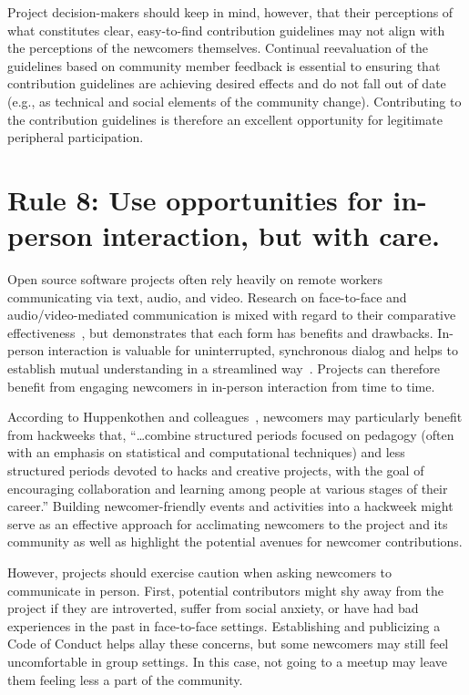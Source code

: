\documentclass[10pt,letterpaper]{article}
\newcommand{\rulemajor}[1]{\section*{#1}}
\begin{document}
Project decision-makers should keep in mind, however,
that their perceptions of what constitutes clear, easy-to-find contribution guidelines
may not align with the perceptions of the newcomers themselves.
Continual reevaluation of the guidelines based on community member feedback is essential
to ensuring that contribution guidelines are achieving desired effects
and do not fall out of date (e.g., as technical and social elements of the community change).
Contributing to the contribution guidelines is therefore
an excellent opportunity for legitimate peripheral participation.

\rulemajor{Rule 8: Use opportunities for in-person interaction, but with care.}

Open source software projects often rely heavily on remote workers communicating via text, audio, and video.
Research on face-to-face and audio/video-mediated communication is mixed
with regard to their comparative effectiveness~\cite{doherty1997,gallupe1990,nardi2002},
but demonstrates that each form has benefits and drawbacks.
In-person interaction is valuable for uninterrupted, synchronous dialog
and helps to establish mutual understanding in a streamlined way~\cite{omalley1996}.
Projects can therefore benefit from engaging newcomers in in-person interaction from time to time.

According to Huppenkothen and colleagues~\cite{huppenkothen2018},
newcomers may particularly benefit from hackweeks that,
``{\ldots}combine structured periods focused on pedagogy
(often with an emphasis on statistical and computational techniques)
and less structured periods devoted to hacks and creative projects,
with the goal of encouraging collaboration and learning among people at various stages of their career.''
Building newcomer-friendly events and activities into a hackweek
might serve as an effective approach for acclimating newcomers to the project and its community
as well as highlight the potential avenues for newcomer contributions.

However,
projects should exercise caution when asking newcomers to communicate in person.
First, potential contributors might shy away from the project if they are introverted,
suffer from social anxiety,
or have had bad experiences in the past in face-to-face settings.
Establishing and publicizing a Code of Conduct helps allay these concerns,
but some newcomers may still feel uncomfortable in group settings.
In this case,
not going to a meetup may leave them feeling less a part of the community.
\end{document}
